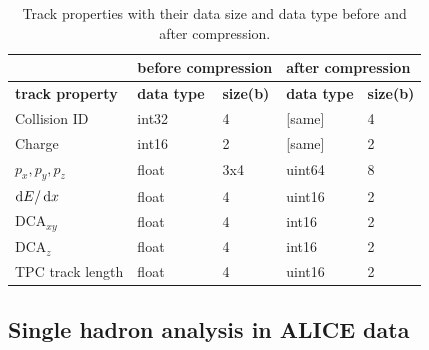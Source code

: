 \documentclass[
  a4paper,
  12pt,
  oneside,
  parskip=half,
  listof=totoc,
  bibliography=totoc,
  DIV=12,
  numbers=noenddot,
  BA.tex
  ]{subfiles}
\begin{document}
\begin{table}[H]
	\begin{footnotesize}
		\begin{center}
			\begin{tabular}{lllll}
				\hline
				& \multicolumn{2}{l}{\textbf{before compression}} & \multicolumn{2}{l}{\textbf{after compression}} \\ \hline
				\textbf{track property} & \multicolumn{1}{l}{\textbf{data type}}  & \textbf{size(b)}  & \multicolumn{1}{l}{\textbf{data type}}  & \textbf{size(b)} \\ \hline
				Collision ID  		& \multicolumn{1}{l}{int32}           &    4   	& \multicolumn{1}{l}{[same]}           	&   4   \\ 
				Charge     			& \multicolumn{1}{l}{int16}           &    2   	& \multicolumn{1}{l}{[same]}           	&   2  	\\ 
				$p_x, p_y, p_z$  	& \multicolumn{1}{l}{float}           &   3x4  	& \multicolumn{1}{l}{uint64}           	&   8  	\\ 
				$\mathop{}\!\mathrm{d} E / \mathop{}\!\mathrm{d} x$   & \multicolumn{1}{l}{float}           &    4    & \multicolumn{1}{l}{uint16}           	&  	2   \\ 
				DCA$_{xy}$        	& \multicolumn{1}{l}{float}           &    4 	& \multicolumn{1}{l}{int16}           	&   2  	\\ 
				DCA$_{z}$        	& \multicolumn{1}{l}{float}           &    4   	& \multicolumn{1}{l}{int16}           	&   2   \\ 
				TPC track length 	& \multicolumn{1}{l}{float}           &    4   	& \multicolumn{1}{l}{uint16}           	&   2   \\ \hline
			\end{tabular}
		\end{center}
	\end{footnotesize}
	\caption{Track properties with their data size and data type before and after compression.}
	\label{table:track_properties}
\end{table}


\subsection{Single hadron analysis in ALICE data}
\end{document}
